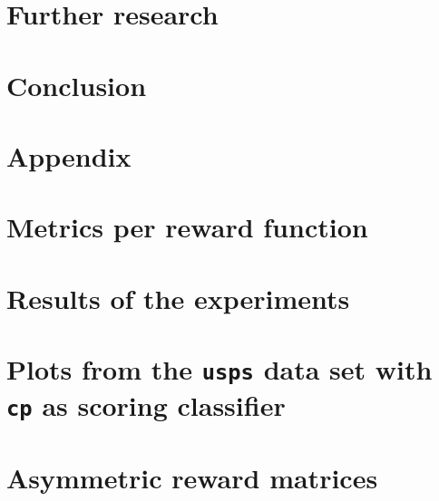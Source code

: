 \documentclass[twoside,11pt]{article}
\begin{document}



\section{Further research}
\label{sec:further_research}

\section{Conclusion}

\newpage

\renewcommand{\appendixpagename}{}
\begin{appendices}
  \section*{Appendix}

  \section{Metrics per reward function}
  \label{sec:metrics_rew}

  

  \newpage

  \section{Results of the experiments}
  \label{sec:res}

  

  \newpage

  \section{Plots from the \texttt{usps} data set with
    \texttt{cp} as scoring classifier}
  \label{sec:plots}

  

  \newpage

  \section{Asymmetric reward matrices}
  \label{sec:asym_rew_mat}

  \setcounter{MaxMatrixCols}{11}


\end{appendices}
\end{document}
